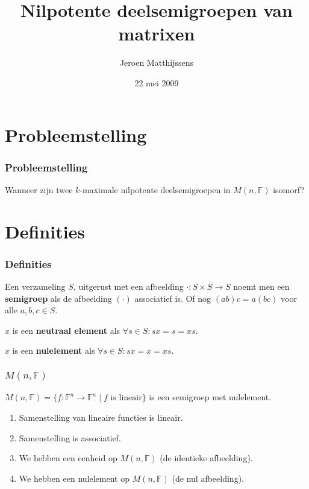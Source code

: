 \documentclass[12pt]{beamer}
\title{Nilpotente deelsemigroepen van matrixen}
\author{Jeroen Matthijssens}
\institute[] {Vrije Universiteit Brussel}
\date[] {22 mei 2009}
\newcommand{\F}{\mathbb{F}}
\begin{document}
\begin{frame}
 \titlepage
\end{frame}

\section{Probleemstelling}

\begin{frame}
\frametitle{Probleemstelling}
Wanneer zijn twee $k$-maximale nilpotente deelsemigroepen in $M(n,\F)$ isomorf?
\end{frame}


\section{Definities}

\begin{frame}
\frametitle{Definities}
\begin{block}{}
Een verzameling $S$, uitgerust met een afbeelding $\cdot : S \times S \to S$ noemt men een \textbf{semigroep} als de afbeelding $(\cdot)$ associatief is. Of nog $(ab)c = a(bc)$ voor alle $a,b,c \in S$.
\end{block}

\begin{block}{}
$x$ is een \textbf{neutraal element} als $\forall s \in S: sx = s = xs$. 

$x$ is een \textbf{nulelement} als $\forall s \in S: sx = x = xs$. 
\end{block}

\end{frame}

\begin{frame}
\frametitle{$M(n,\F)$}

\begin{block}{}
$M(n,\F) = \{ f : \F^n \to \F^n \; | \; f \text{ is lineair} \}$ is een semigroep met nulelement.
\begin{enumerate}
\item Samenstelling van lineaire functies is lineair.
\item Samenstelling is associatief.
\item We hebben een eenheid op $M(n,\F)$ (de identieke afbeelding).
\item We hebben een nulelement op $M(n,\F)$ (de nul afbeelding).
\end{enumerate}

\end{block}

\end{frame}
\end{document}
